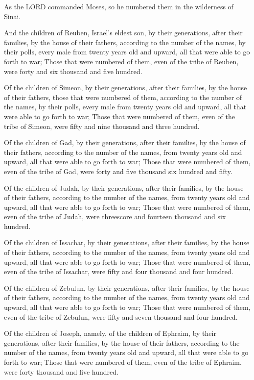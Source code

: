\verse As the LORD commanded Moses, so he numbered them in the
wilderness of Sinai.

\verse And the children of Reuben, Israel's eldest son, by their
generations, after their families, by the house of their fathers,
according to the number of the names, by their polls, every male from
twenty years old and upward, all that were able to go forth to war;
\verse Those that were numbered of them, even of the tribe of Reuben,
were forty and six thousand and five hundred.

\verse Of the children of Simeon, by their generations, after their
families, by the house of their fathers, those that were numbered of
them, according to the number of the names, by their polls, every male
from twenty years old and upward, all that were able to go forth to
war; \verse Those that were numbered of them, even of the tribe of
Simeon, were fifty and nine thousand and three hundred.

\verse Of the children of Gad, by their generations, after their
families, by the house of their fathers, according to the number of
the names, from twenty years old and upward, all that were able to go
forth to war; \verse Those that were numbered of them, even of the tribe
of Gad, were forty and five thousand six hundred and fifty.

\verse Of the children of Judah, by their generations, after their
families, by the house of their fathers, according to the number of
the names, from twenty years old and upward, all that were able to go
forth to war; \verse Those that were numbered of them, even of the tribe
of Judah, were threescore and fourteen thousand and six hundred.

\verse Of the children of Issachar, by their generations, after their
families, by the house of their fathers, according to the number of
the names, from twenty years old and upward, all that were able to go
forth to war; \verse Those that were numbered of them, even of the tribe
of Issachar, were fifty and four thousand and four hundred.

\verse Of the children of Zebulun, by their generations, after their
families, by the house of their fathers, according to the number of
the names, from twenty years old and upward, all that were able to go
forth to war; \verse Those that were numbered of them, even of the tribe
of Zebulun, were fifty and seven thousand and four hundred.

\verse Of the children of Joseph, namely, of the children of Ephraim, by
their generations, after their families, by the house of their
fathers, according to the number of the names, from twenty years old
and upward, all that were able to go forth to war; \verse Those that
were numbered of them, even of the tribe of Ephraim, were forty
thousand and five hundred.

